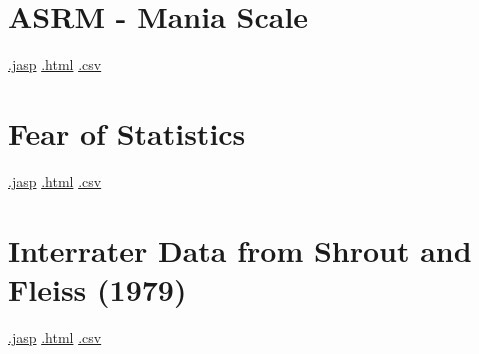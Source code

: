 \documentclass[
  letterpaper,
  DIV=11,
  numbers=noendperiod]{scrreprt}
\begin{document}
\hypertarget{asrm---mania-scale}{%
\section{ASRM - Mania Scale}\label{asrm---mania-scale}}

\textbar{}
\href{https://github.com/jasp-stats/jasp-data-library/raw/main/ASRM\%20-\%20Mania\%20Scale/ASRM\%20-\%20Mania\%20Scale.jasp}{.jasp}
\textbar{}
\href{https://htmlpreview.github.io/?https://github.com/jasp-stats/jasp-data-library/blob/main/ASRM\%20-\%20Mania\%20Scale/index.html}{.html}
\textbar{}
\href{https://raw.githubusercontent.com/jasp-stats/jasp-data-library/main/ASRM\%20-\%20Mania\%20Scale/ASRM\%20-\%20Mania\%20Scale.csv}{.csv}

\hypertarget{fear-of-statistics}{%
\section{Fear of Statistics}\label{fear-of-statistics}}

\textbar{}
\href{https://github.com/jasp-stats/jasp-data-library/raw/main/Fear\%20of\%20Statistics/Fear\%20of\%20Statistics.jasp}{.jasp}
\textbar{}
\href{https://htmlpreview.github.io/?https://github.com/jasp-stats/jasp-data-library/blob/main/Fear\%20of\%20Statistics/index.html}{.html}
\textbar{}
\href{https://raw.githubusercontent.com/jasp-stats/jasp-data-library/main/Fear\%20of\%20Statistics/Fear\%20of\%20Statistics.csv}{.csv}

\hypertarget{interrater-data-from-shrout-and-fleiss-1979}{%
\section{Interrater Data from Shrout and Fleiss
(1979)}\label{interrater-data-from-shrout-and-fleiss-1979}}

\textbar{}
\href{https://github.com/jasp-stats/jasp-data-library/raw/main/Interrater\%20Data\%20from\%20Shrout\%20and\%20Fleiss\%20(1979)/Interrater\%20Data\%20from\%20Shrout\%20and\%20Fleiss\%20(1979).jasp}{.jasp}
\textbar{}
\href{https://htmlpreview.github.io/?https://github.com/jasp-stats/jasp-data-library/blob/main/Interrater\%20Data\%20from\%20Shrout\%20and\%20Fleiss\%20(1979)/index.html}{.html}
\textbar{}
\href{https://raw.githubusercontent.com/jasp-stats/jasp-data-library/main/Interrater\%20Data\%20from\%20Shrout\%20and\%20Fleiss\%20(1979)/Interrater\%20Data\%20from\%20Shrout\%20and\%20Fleiss\%20(1979).csv}{.csv}

\end{document}
